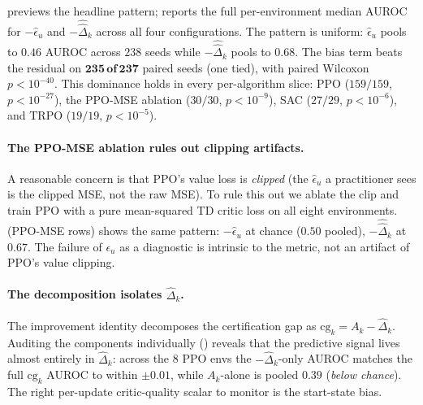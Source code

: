 \documentclass[11pt]{article}
\begin{document}
 previews the headline pattern;  reports the full per-environment median AUROC for $-\widehat\epsilon_u$ and $-\widehat{\hat\Delta}_k$ across all four configurations. The pattern is uniform: $\widehat\epsilon_u$ pools to $0.46$ AUROC across $238$ seeds while $-\widehat{\hat\Delta}_k$ pools to $0.68$. The bias term beats the residual on $\mathbf{235\,\textbf{of}\,237}$ paired seeds (one tied), with paired Wilcoxon $p < 10^{-40}$. This dominance holds in every per-algorithm slice: PPO ($159/159$, $p < 10^{-27}$), the PPO-MSE ablation ($30/30$, $p < 10^{-9}$), SAC ($27/29$, $p < 10^{-6}$), and TRPO ($19/19$, $p < 10^{-5}$).



\paragraph{The PPO-MSE ablation rules out clipping artifacts.}
A reasonable concern is that PPO's value loss is \emph{clipped} (the $\widehat\epsilon_u$ a practitioner sees is the clipped MSE, not the raw MSE). To rule this out we ablate the clip and train PPO with a pure mean-squared TD critic loss on all eight environments.  (PPO-MSE rows) shows the same pattern: $-\widehat\epsilon_u$ at chance ($0.50$ pooled), $-\widehat{\hat\Delta}_k$ at $0.67$. The failure of $\epsilon_u$ as a diagnostic is intrinsic to the metric, not an artifact of PPO's value clipping.

\paragraph{The decomposition isolates $\hat\Delta_k$.}
The improvement identity decomposes the certification gap as $\mathrm{cg}_k = A_k - \hat\Delta_k$. Auditing the components individually () reveals that the predictive signal lives almost entirely in $\hat\Delta_k$: across the 8 PPO envs the $-\hat\Delta_k$-only AUROC matches the full $\mathrm{cg}_k$ AUROC to within $\pm 0.01$, while $A_k$-alone is pooled $0.39$ (\emph{below chance}). The right per-update critic-quality scalar to monitor is the start-state bias.
\end{document}
